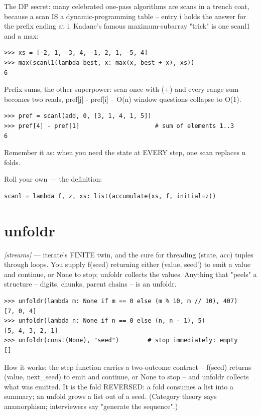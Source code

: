 \documentclass[11pt,letterpaper]{book}
\begin{document}
The DP secret: many celebrated one-pass algorithms are scans in a trench coat, because a scan IS a dynamic-programming table -- entry i holds the answer for the prefix ending at i. Kadane's famous maximum-subarray "trick" is one scanl1 and a max:

\begin{lstlisting}[style=spec]
>>> xs = [-2, 1, -3, 4, -1, 2, 1, -5, 4]
>>> max(scanl1(lambda best, x: max(x, best + x), xs))
6
\end{lstlisting}

Prefix sums, the other superpower: scan once with (+) and every range sum becomes two reads, pref[j] - pref[i] -- O(n) window questions collapse to O(1).

\begin{lstlisting}[style=spec]
>>> pref = scanl(add, 0, [3, 1, 4, 1, 5])
>>> pref[4] - pref[1]                     # sum of elements 1..3
6
\end{lstlisting}

Remember it as: when you need the state at EVERY step, one scan replaces n folds.


Roll your own --- the definition:

\begin{lstlisting}[style=code]
scanl = lambda f, z, xs: list(accumulate(xs, f, initial=z))
\end{lstlisting}

\section{unfoldr}
\noindent\textit{[streams]} --- iterate's FINITE twin, and the cure for threading (state, acc) tuples through loops. You supply f(seed) returning either (value, seed') to emit a value and continue, or None to stop; unfoldr collects the values. Anything that "peels" a structure -- digits, chunks, parent chains -- is an unfoldr.
\begin{lstlisting}[style=spec]
>>> unfoldr(lambda m: None if m == 0 else (m % 10, m // 10), 407)
[7, 0, 4]
>>> unfoldr(lambda n: None if n == 0 else (n, n - 1), 5)
[5, 4, 3, 2, 1]
>>> unfoldr(const(None), "seed")        # stop immediately: empty
[]
\end{lstlisting}

How it works: the step function carries a two-outcome contract -- f(seed) returns (value, next\_seed) to emit and continue, or None to stop -- and unfoldr collects what was emitted. It is the fold REVERSED: a fold consumes a list into a summary; an unfold grows a list out of a seed. (Category theory says anamorphism; interviewers say "generate the sequence".)
\end{document}
